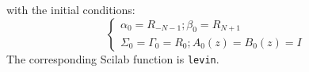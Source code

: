 with the initial conditions:
\begin{equation}
\left\{ 
\begin{array}{l}
\alpha_0=R_{-N-1};
\beta_0=R_{N+1}\\
\Sigma_0=\Gamma_0=R_0;
A_0(z)=B_0(z)=I
\end{array}
\right.
\label{e.lev.25}
\end{equation} 
The corresponding Scilab function is {\tt levin}.

%
